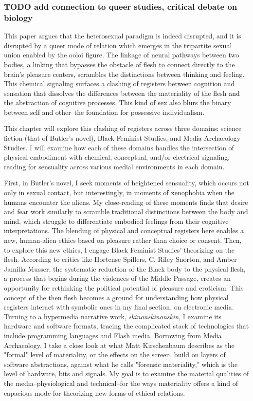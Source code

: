 \documentclass[11pt]{article}
\begin{document}
\subsubsection{{\bfseries\sffamily TODO} add connection to queer studies, critical debate on biology}
\label{sec:org5581bdc}
This paper argues that the heterosexual paradigm is indeed disrupted,
and it is disrupted by a queer mode of relation which emerges in the
tripartite sexual union enabled by the ooloi figure. The linkage of
neural pathways between two bodies, a linking that bypasses the
obstacle of flesh to connect directly to the brain's pleasure centers,
scrambles the distinctions between thinking and feeling. This chemical
signaling surfaces a clashing of registers between cognition and
sensation that dissolves the differences between the materiality of
the flesh and the abstraction of cognitive processes. This kind of sex
also blurs the binary between self and other--the foundation for
possessive individualism.

This chapter will explore this clashing of registers across three
domains: science fiction (that of Butler's novel), Black Feminist
Studies, and Media Archaeology Studies. I will examine how each of
these domains handles the intersection of physical embodiment with
chemical, conceptual, and/or electrical signaling, reading for
sensuality across various medial environments in each domain. 

First, in Butler's novel, I seek moments of heightened sensuality,
which occurs not only in sexual contact, but interestingly, in moments
of xenophobia when the humans encounter the aliens. My close-reading
of these moments finds that desire and fear work similarly to scramble
traditional distinctions between the body and mind, which struggle to
differentiate embodied feelings from their cognitive
interpretations. The blending of physical and conceptual registers
here enables a new, human-alien ethics based on pleasure rather than
choice or consent. Then, to explore this new ethics, I engage Black
Feminist Studies’ theorizing on the flesh. According to critics like
Hortense Spillers, C. Riley Snorton, and Amber Jamilla Musser, the
systematic reduction of the Black body to the physical flesh, a
process that begins during the violences of the Middle Passage,
creates an opportunity for rethinking the political potential of
pleasure and eroticism. This concept of the then flesh becomes a
ground for understanding how physical registers interact with symbolic
ones in my final section, on electronic media. Turning to a hypermedia
narrative work, \emph{skinonskinonskin}, I examine its hardware and
software formats, tracing the complicated stack of technologies that
include programming languages and Flash media. Borrowing from Media
Archaeology, I take a close look at what Matt Kirschenbaum describes
as the "formal" level of materiality, or the effects on the screen,
build on layers of software abstractions, against what he calls
"forensic materiality," which is the level of hardware, bits and
signals. My goal is to examine the material qualities of the
media--physiological and technical--for the ways materiality offers a
kind of capacious mode for theorizing new forms of ethical relations.
\end{document}
